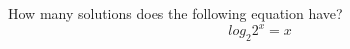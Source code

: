\documentclass{ximera}
\author{David Kish}
\begin{document}
\begin{exercise}
How many solutions does the following equation have? \\
\[
log_2{2^x}=x
\]
\begin{multipleChoice}  
\end{multipleChoice}  
\end{exercise}
\end{document}
